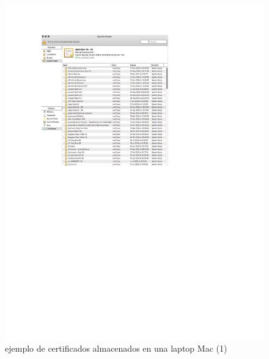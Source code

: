 \documentclass[12pt]{report} %
\begin{document}
\begin{figure}
\centering
\includegraphics[width=0.85\columnwidth]{imagenes/certificadofirmaej.pdf}
\caption{ejemplo de certificados almacenados en una laptop Mac (1)}
\label{Fig.certificadofirma}
\end{figure} 
\end{document}
